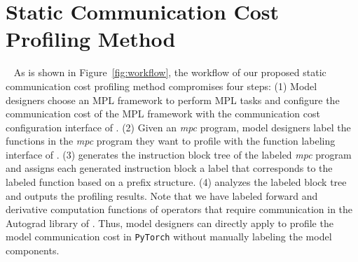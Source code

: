 
\section{Static Communication Cost Profiling Method}~\label{sec:analysis} 
As is shown in Figure~\ref{fig:workflow}, the workflow of our proposed static communication cost profiling method compromises four steps: (1) Model designers choose an MPL framework to perform MPL tasks and configure the communication cost of the MPL framework with the communication cost configuration interface of \hawkeye. (2) Given an \textit{mpc} program, model designers label the functions in the \textit{mpc} program they want to profile with the function labeling interface of \hawkeye. (3) \hawkeye generates the instruction block tree of the labeled \textit{mpc} program and assigns each generated instruction block a label that corresponds to the labeled function based on a prefix structure. (4) \hawkeye analyzes the labeled block tree and outputs the profiling results. Note that we have labeled forward and derivative computation functions of operators that require communication in the Autograd library of \hawkeye. Thus, model designers can directly apply \hawkeye to profile the model communication cost in \texttt{PyTorch} without manually labeling the model components.

